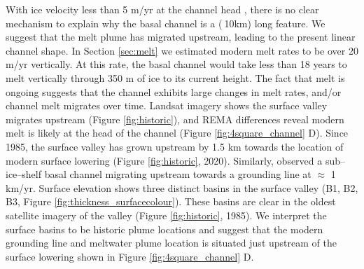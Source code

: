 With ice velocity less than 5 m/yr at the channel head \citep{rignot2017measures},  there is no clear mechanism to explain why the basal channel is a ($\>$10km) long feature. We suggest that the melt plume has migrated upstream, leading to the present linear channel shape.  
In Section \ref{sec:melt} we estimated modern melt rates to be over 20 m/yr vertically. At this rate, the basal channel would take less than 18 years to melt vertically through 350 m of ice to its current height.  The fact that melt is ongoing suggests that the channel exhibits large changes in melt rates, and/or channel melt migrates over time. Landsat imagery shows the surface valley migrates upstream (Figure \ref{fig:historic}), and REMA differences reveal modern melt is likely at the head of the channel (Figure \ref{fig:4square_channel} D).   Since 1985, the surface valley has grown upstream by 1.5 km towards the location of modern surface lowering (Figure \ref{fig:historic}, 2020).
Similarly, \cite{chartrand2020basal} observed a sub--ice--shelf basal channel migrating upstream towards a grounding line at $\approx$ 1 km/yr.
Surface elevation shows three distinct basins in the surface valley (B1, B2, B3, Figure \ref{fig:thickness_surfacecolour}). These basins are clear in the oldest satellite imagery of the valley (Figure \ref{fig:historic}, 1985). We interpret the surface basins to be historic plume locations and suggest that the modern grounding line and meltwater plume location is situated just upstream of the surface lowering shown in Figure \ref{fig:4square_channel} D. 

